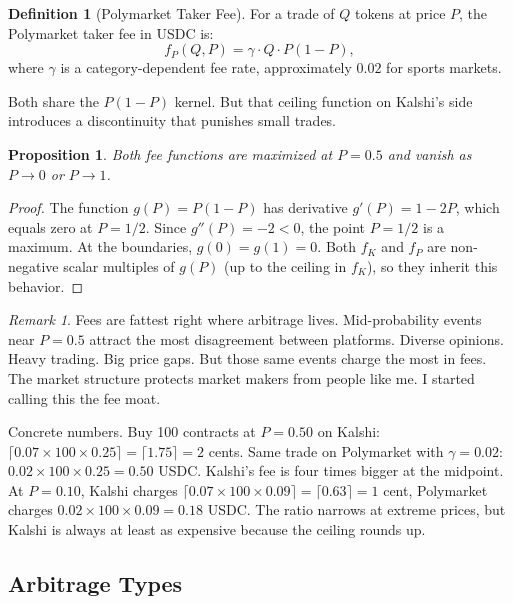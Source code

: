 \documentclass[11pt]{article}
\newtheorem{proposition}[theorem]{Proposition}
\theoremstyle{definition}
\newtheorem{definition}[theorem]{Definition}
\theoremstyle{remark}
\newtheorem{remark}[theorem]{Remark}
\begin{document}
\begin{definition}[Polymarket Taker Fee]
\label{def:poly-fee}
For a trade of $Q$ tokens at price $P$, the Polymarket taker fee in USDC is:
\begin{equation}
\label{eq:poly-fee}
f_P(Q, P) = \gamma \cdot Q \cdot P(1-P),
\end{equation}
where $\gamma$ is a category-dependent fee rate, approximately $0.02$ for sports markets.
\end{definition}

Both share the $P(1-P)$ kernel. But that ceiling function on Kalshi's side introduces a discontinuity that punishes small trades.

\begin{proposition}
\label{prop:fee-max}
Both fee functions are maximized at $P = 0.5$ and vanish as $P \to 0$ or $P \to 1$.
\end{proposition}

\begin{proof}
The function $g(P) = P(1-P)$ has derivative $g'(P) = 1 - 2P$, which equals zero at $P = 1/2$. Since $g''(P) = -2 < 0$, the point $P = 1/2$ is a maximum. At the boundaries, $g(0) = g(1) = 0$. Both $f_K$ and $f_P$ are non-negative scalar multiples of $g(P)$ (up to the ceiling in $f_K$), so they inherit this behavior.
\end{proof}

\begin{remark}
\label{rem:fee-moat}
Fees are fattest right where arbitrage lives. Mid-probability events near $P = 0.5$ attract the most disagreement between platforms. Diverse opinions. Heavy trading. Big price gaps. But those same events charge the most in fees. The market structure protects market makers from people like me. I started calling this the fee moat.
\end{remark}

Concrete numbers. Buy 100 contracts at $P = 0.50$ on Kalshi: $\lceil 0.07 \times 100 \times 0.25 \rceil = \lceil 1.75 \rceil = 2$ cents. Same trade on Polymarket with $\gamma = 0.02$: $0.02 \times 100 \times 0.25 = 0.50$ USDC. Kalshi's fee is four times bigger at the midpoint. At $P = 0.10$, Kalshi charges $\lceil 0.07 \times 100 \times 0.09 \rceil = \lceil 0.63 \rceil = 1$ cent, Polymarket charges $0.02 \times 100 \times 0.09 = 0.18$ USDC. The ratio narrows at extreme prices, but Kalshi is always at least as expensive because the ceiling rounds up.

\subsection{Arbitrage Types}
\label{sec:arb-types}
\end{document}
